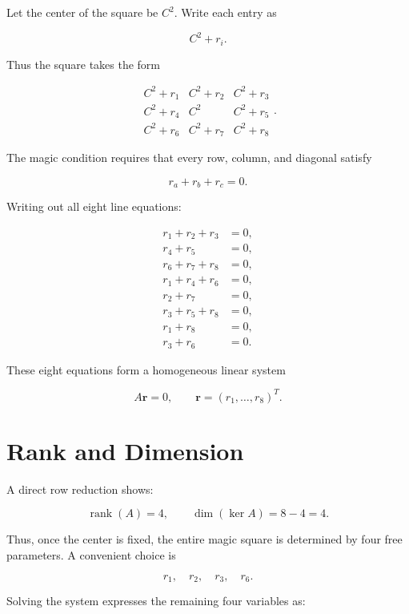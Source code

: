 \documentclass[12pt]{article}
\begin{document}
Let the center of the square be $C^2$.  Write each entry as


\[
C^2 + r_i.
\]


Thus the square takes the form


\[
\begin{matrix}
C^2+r_1 & C^2+r_2 & C^2+r_3 \\
C^2+r_4 & C^2     & C^2+r_5 \\
C^2+r_6 & C^2+r_7 & C^2+r_8
\end{matrix}.
\]



The magic condition requires that every row, column, and diagonal satisfy


\[
r_a + r_b + r_c = 0.
\]



Writing out all eight line equations:


\[
\begin{aligned}
r_1+r_2+r_3 &= 0,\\
r_4+r_5 &= 0,\\
r_6+r_7+r_8 &= 0,\\
r_1+r_4+r_6 &= 0,\\
r_2+r_7 &= 0,\\
r_3+r_5+r_8 &= 0,\\
r_1+r_8 &= 0,\\
r_3+r_6 &= 0.
\end{aligned}
\]



These eight equations form a homogeneous linear system


\[
A\mathbf{r} = 0,\qquad \mathbf{r}=(r_1,\dots,r_8)^T.
\]



\section{Rank and Dimension}

A direct row reduction shows:


\[
\operatorname{rank}(A)=4,
\qquad
\dim(\ker A)=8-4=4.
\]



Thus, once the center is fixed, the entire magic square is determined by four
free parameters.  A convenient choice is


\[
r_1,\quad r_2,\quad r_3,\quad r_6.
\]



Solving the system expresses the remaining four variables as:
\end{document}
